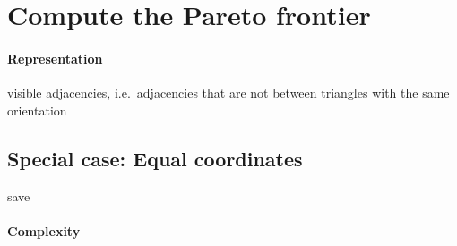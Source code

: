 \section{Compute the Pareto frontier}

\paragraph{Representation}






visible adjacencies, i.e.\ adjacencies that are not between triangles with the same orientation

\subsection{Special case: Equal coordinates}



save

\paragraph{Complexity} 
